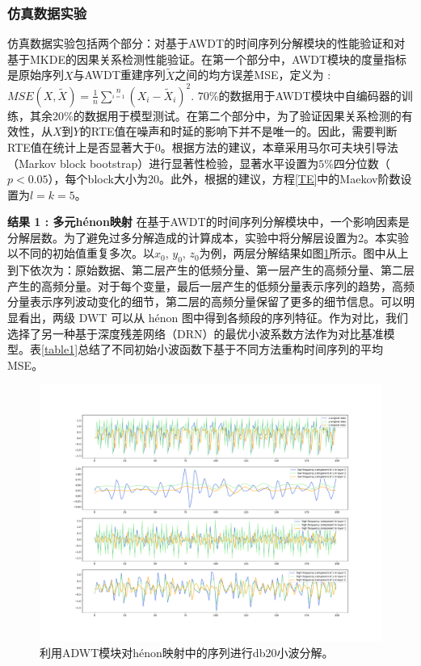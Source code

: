 \subsubsection{仿真数据实验}
仿真数据实验包括两个部分：对基于AWDT的时间序列分解模块的性能验证和对基于MKDE的因果关系检测性能验证。在第一个部分中，AWDT模块的度量指标是原始序列$X$与AWDT重建序列$\tilde{X}$之间的均方误差MSE，定义为 : $MSE(X,\tilde{X}) = \frac{1}{n}\sum\limits^{n}\limits_{i=1}(X_{i}-\tilde{X}_{i})^{2}$. $70\%$的数据用于AWDT模块中自编码器的训练，其余$20\%$的数据用于模型测试。在第二个部分中，为了验证因果关系检测的有效性，从$X$到$Y$的RTE值在噪声和时延的影响下并不是唯一的。因此，需要判断RTE值在统计上是否显著大于0。根据\cite{3_29}方法的建议，本章采用马尔可夫块引导法（Markov block bootstrap）进行显著性检验，显著水平设置为$5\%$四分位数（$p<0.05$），每个block大小为20。此外，根据\cite{3_30}的建议，方程\eqref{TE}中的Maekov阶数设置为$l=k=5$。

\textbf{结果 1 : 多元h\'{e}non映射}
在基于AWDT的时间序列分解模块中，一个影响因素是分解层数。为了避免过多分解造成的计算成本，实验中将分解层设置为2。本实验以不同的初始值重复多次。以$x_{0}$, $y_{0}$, $z_{0}$为例，两层分解结果如图\ref{figure3}所示。图中从上到下依次为：原始数据、第二层产生的低频分量、第一层产生的高频分量、第二层产生的高频分量。对于每个变量，最后一层产生的低频分量表示序列的趋势，高频分量表示序列波动变化的细节，第二层的高频分量保留了更多的细节信息。可以明显看出，两级 DWT 可以从 h\'{e}non 图中得到各频段的序列特征。作为对比，我们选择了另一种基于深度残差网络（DRN）的最优小波系数方法作为对比基准模型。表\ref{table1}总结了不同初始小波函数下基于不同方法重构时间序列的平均MSE。
\begin{figure}[!ht]
\begin{center}
\includegraphics[width=1\textwidth]{./ch3/fig3_3.pdf}
\caption{利用ADWT模块对h\'{e}non映射中的序列进行db20小波分解。} \label{figure3}
\end{center}
\end{figure}

